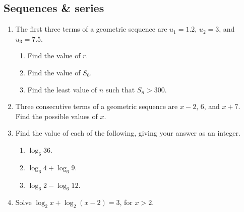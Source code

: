 \documentclass[12pt, oneside]{article}
\begin{document}
\subsection*{Sequences \& series}
\begin{enumerate}
\item The first three terms of a geometric sequence are $u_1=1.2$, $u_2=3$, and $u_3=7.5$.
\begin{enumerate}
    \item Find the value of $r$.
        \begin{flushright}[2]\end{flushright}
    \item Find the value of $S_6$.
        \begin{flushright}[2]\end{flushright}
    \item Find the least value of $n$
such that $S_n>300$. 
        \begin{flushright}[3]\end{flushright}
\end{enumerate}

\item Three consecutive terms of a geometric sequence are $x-2$, 6, and $x+7$.\\
Find the possible values of $x$.
    \begin{flushright}[6]\end{flushright}


\item Find the value of each of the following, giving your answer as an integer.
\begin{enumerate}
    \item $\log_6 36$.
        \begin{flushright}[2]\end{flushright}
    \item $\log_6 4 + \log_6 9$.
        \begin{flushright}[2]\end{flushright}
    \item $\log_6 2 - \log_6 12$.
        \begin{flushright}[3]\end{flushright}
\end{enumerate}

\item Solve $\log_2 x + \log_2 (x-2) = 3$, for $x>2$.
    \begin{flushright}[7]\end{flushright}


\end{enumerate}
\end{document}
